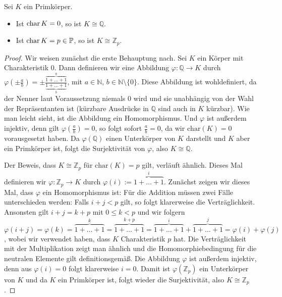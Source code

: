\begin{theorem} \label{theorem:primkoerper}
    Sei $K$ ein Primkörper.
    \begin{itemize}
        \item Ist $\operatorname{char} K = 0$, so ist $K \cong \mathbb{Q}$.
        \item Ist $\operatorname{char} K = p \in \mathbb{P}$, so ist $K \cong \mathbb{Z}_p$.
    \end{itemize}
\end{theorem}

\begin{proof}
    Wir weisen zunächst die erste Behauptung nach. Sei $K$ ein Körper mit Charakteristik $0$.
    Dann definieren wir eine Abbildung $\varphi:\mathbb{Q}\to K$ durch $\varphi(\pm\frac{a}{b})=\pm\frac{\overbrace{1+\ldots+1}^{a}}{\underbrace{1+\ldots+1}_{b}}$,
    mit $a\in \mathbb{N}$, $b\in\mathbb{N}\setminus\{0\}$. Diese Abbildung ist wohldefiniert,
    da der Nenner laut Voraussetzung niemals $0$ wird und sie unabhängig von der Wahl der Repräsentanten ist
    (kürzbare Ausdrücke in $\mathbb{Q}$ sind auch in $K$ kürzbar).
    Wie man leicht sieht, ist die Abbildung ein Homomorphismus. Und $\varphi$ ist außerdem injektiv, denn gilt
    $\varphi(\frac{a}{b})=0$, so folgt sofort $\frac{a}{b}=0$, da wir $\mathrm{char}(K)=0$ vorausgesetzt haben.
    Da $\varphi(\mathbb{Q})$ einen Unterkörper von $K$ darstellt und $K$ aber ein Primkörper ist, folgt die Surjektivität von $\varphi$,
    also $K\cong \mathbb{Q}$.

    Der Beweis, dass $K\cong\mathbb{Z}_p$ für $\mathrm{char}(K)=p$ gilt, verläuft ähnlich.
    Dieses Mal definieren wir $\varphi:\mathbb{Z}_p\to K$ durch $\varphi(i):=\overbrace{1+\ldots+1}^{i}$.
    Zunächst zeigen wir dieses Mal, dass $\varphi$ ein Homomorphismus ist:
    Für die Addition müssen zwei Fälle unterschieden werden: Falls $i+j<p$ gilt, so folgt klarerweise die
    Verträglichkeit. Ansonsten gilt $i+j=k+p$ mit $0\le k< p$ und wir folgern 
    $\varphi(i+j)=\varphi(k)=\overbrace{1+\ldots+1}^{k}=\overbrace{1+\ldots+1}^{k+p}=\overbrace{1+\ldots+1}^{i}+\overbrace{1+\ldots+1}^{j}=\varphi(i)+\varphi(j)$,
    wobei wir verwendet haben, dass $K$ Charakteristik $p$ hat. Die Verträglichkeit mit der Multiplikation zeigt man ähnlich
    und die Homomorphiebedingung für die neutralen Elemente gilt definitionsgemäß. Die Abbildung
    $\varphi$ ist außerdem injektiv, denn aus $\varphi(i)=0$ folgt klarerweise $i=0$. Damit ist
    $\varphi(\mathbb{Z}_p)$ ein Unterkörper von $K$ und da $K$ ein Primkörper ist, folgt wieder die Surjektivität,
    also $K\cong \mathbb{Z}_p$.


\end{proof}